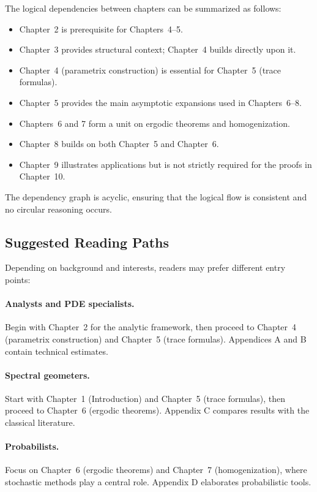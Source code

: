 The logical dependencies between chapters can be summarized as follows:

\begin{itemize}
  \item Chapter~2 is prerequisite for Chapters~4–5.
  \item Chapter~3 provides structural context; Chapter~4 builds directly upon
  it.
  \item Chapter~4 (parametrix construction) is essential for Chapter~5 (trace
  formulas).
  \item Chapter~5 provides the main asymptotic expansions used in Chapters~6–8.
  \item Chapters~6 and 7 form a unit on ergodic theorems and homogenization.
  \item Chapter~8 builds on both Chapter~5 and Chapter~6.
  \item Chapter~9 illustrates applications but is not strictly required for the
  proofs in Chapter~10.
\end{itemize}

The dependency graph is acyclic, ensuring that the logical flow is consistent
and no circular reasoning occurs.

\subsection{Suggested Reading Paths}

Depending on background and interests, readers may prefer different entry
points:

\paragraph{Analysts and PDE specialists.}
Begin with Chapter~2 for the analytic framework, then proceed to Chapter~4
(parametrix construction) and Chapter~5 (trace formulas). Appendices A and B
contain technical estimates.

\paragraph{Spectral geometers.}
Start with Chapter~1 (Introduction) and Chapter~5 (trace formulas), then
proceed to Chapter~6 (ergodic theorems). Appendix C compares results with the
classical literature.

\paragraph{Probabilists.}
Focus on Chapter~6 (ergodic theorems) and Chapter~7 (homogenization), where
stochastic methods play a central role. Appendix D elaborates probabilistic
tools.

